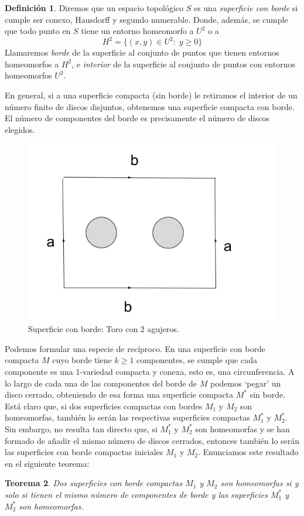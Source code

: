 \documentclass[a4paper,11pt,spanish, twoside, leqno]{tfg-uam}
\newtheorem{teor}{Teorema}[chapter]
\theoremstyle{definition}
\newtheorem{defin}[teor]{Definici\'on}
\begin{document}
\begin{defin}
Diremos que un espacio topológico $S$ es una \textit{superficie con borde} si cumple ser conexo, Hausdorff y segundo numerable. Donde, además, se cumple que todo punto en $S$ tiene un entorno homeomorfo a $U^2$ o a
\[H^2 = \{(x,y)\in U^2:\; y\geq0 \}\]
Llamaremos \textit{borde} de la superficie al conjunto de puntos que tienen entornos homeomorfos a $H^2$, e \textit{interior} de la superficie al conjunto de puntos con entornos homeomorfos $U^2$.
\end{defin}

En general, si a una superficie compacta (sin borde) le retiramos el interior de un número finito de discos disjuntos, obtenemos una superficie compacta con borde. El número de componentes del borde es precisamente el número de discos elegidos. 

\begin{figure}[h!]
	\centering
	\includegraphics[width=0.3\linewidth]{imagenes/ejemploborde.png}
	\caption{Superficie con borde: Toro con 2 agujeros.}
    \label{fig:superfconborde}
\end{figure}

Podemos formular una especie de recíproco. En una superficie con borde compacta $M$ cuyo borde tiene $k \geq 1$ componentes, se cumple que cada componente es una 1-variedad compacta y conexa, esto es, una circunferencia. A lo largo de cada una de las componentes del borde de $M$ podemos `pegar' un disco cerrado, obteniendo de esa forma una superficie compacta $M^*$ sin borde. Está claro que, si dos superficies compactas con bordes $M_1$ y $M_2$ son homeomorfas, también lo serán las respectivas superficies compactas $M_1^*$ y $M_2^*$. Sin embargo, no resulta tan directo que, si $M_1^*$ y $M_2^*$ son homeomorfas y se han formado de añadir el mismo número de discos cerrados,  entonces también lo serán las superficies con borde compactas iniciales $M_1$ y $M_2$. Enunciamos este resultado en el siguiente teorema:

\begin{teor}
\label{teor:clasifcompactaconborde}
Dos superficies con borde compactas $M_1$ y $M_2$ son homeomorfas si y solo si tienen el mismo número de componentes de borde y las superficies $M_1^*$ y $M_2^*$ son homeomorfas.
\end{teor}
\end{document}
